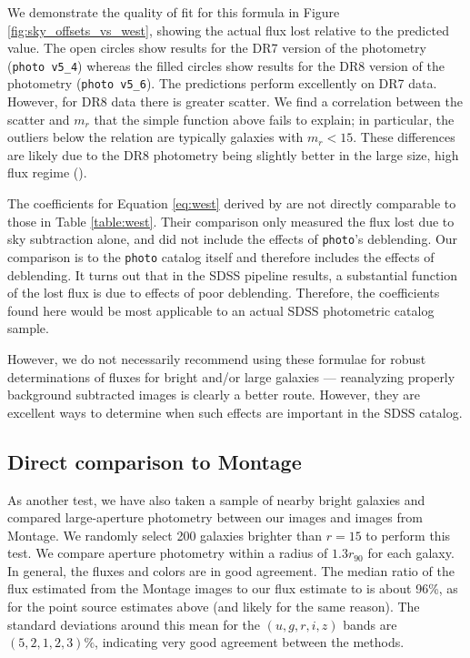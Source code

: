 \documentclass[10pt,preprint]{aastex}
\begin{document}
We demonstrate the quality of fit for this formula in Figure
\ref{fig:sky_offsets_vs_west}, showing the actual flux lost relative
to the predicted value. The open circles show results for the DR7
version of the photometry ({\tt photo v5\_4}) whereas the filled
circles show results for the DR8 version of the photometry ({\tt photo
  v5\_6}).  The predictions perform excellently on DR7 data.  However,
for DR8 data there is greater scatter.  We find a correlation between
the scatter and $m_r$ that the simple function above fails to explain;
in particular, the outliers below the relation are typically galaxies
with $m_r<15$.  These differences are likely due to the DR8 photometry
being slightly better in the large size, high flux regime
(\citealt{aihara11a}).

The coefficients for Equation \ref{eq:west} derived by \citet{west10a}
are not directly comparable to those in Table \ref{table:west}. Their
comparison only measured the flux lost due to sky subtraction alone,
and did not include the effects of {\tt photo}'s deblending. Our
comparison is to the {\tt photo} catalog itself and therefore includes
the effects of deblending.  It turns out that in the SDSS pipeline
results, a substantial function of the lost flux is due to effects of
poor deblending. Therefore, the coefficients found here would be most
applicable to an actual SDSS photometric catalog sample.

However, we do not necessarily recommend using these formulae for
robust determinations of fluxes for bright and/or large galaxies ---
reanalyzing properly background subtracted images is clearly a better
route.  However, they are excellent ways to determine when such
effects are important in the SDSS catalog.

\subsection{Direct comparison to Montage} 
\label{sec:galmontage}

As another test, we have also taken a sample of nearby bright galaxies
and compared large-aperture photometry between our images and images
from Montage. We randomly select 200 galaxies brighter than $r=15$ to
perform this test. We compare aperture photometry within a radius of
$1.3 r_{90}$ for each galaxy. In general, the fluxes and colors are in
good agreement. The median ratio of the flux estimated from the
Montage images to our flux estimate to is about 96\%, as for the point
source estimates above (and likely for the same reason). The standard
deviations around this mean for the $(u,g,r,i,z)$ bands are
$(5,2,1,2,3)\%$, indicating very good agreement between the methods.
\end{document}
